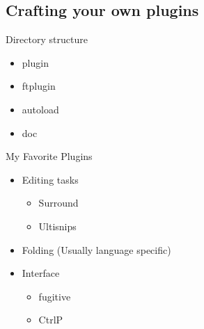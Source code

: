 \documentclass{beamer}
\begin{document}
    \subsection{Crafting your own plugins}
    \begin{frame}{Directory structure}
        \begin{itemize}
            \item plugin
            \item ftplugin
            \item autoload
            \item doc
        \end{itemize}
    \end{frame}
    \begin{frame}{My Favorite Plugins}
        \begin{itemize}
            \item Editing tasks
                \begin{itemize}
                    \item Surround
                    \item Ultisnips
                \end{itemize}
            \item Folding (Usually language specific)
            \item Interface
                \begin{itemize}
                    \item fugitive
                    \item CtrlP
                \end{itemize}
        \end{itemize}
    \end{frame}
\end{document}

